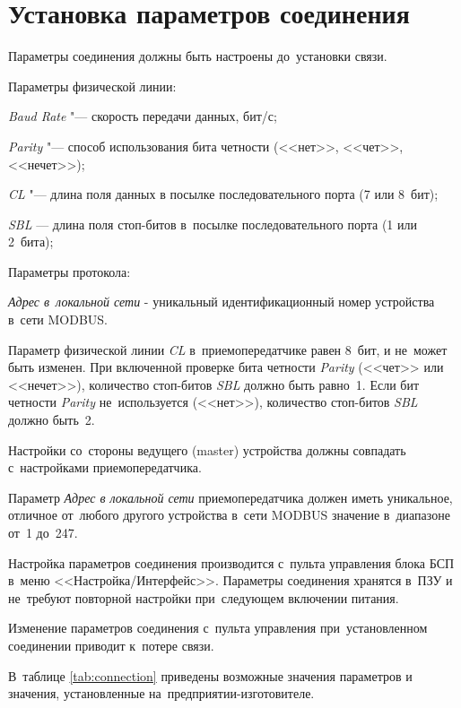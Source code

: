 \section{Установка параметров соединения} \label{sec:setup}

Параметры соединения должны быть настроены до~установки связи. 

Параметры физической линии:
\begin{list}{--}{}
	\item \textit{Baud Rate} "--- скорость передачи данных, бит/с; 
	\item \textit{Parity} "--- способ использования бита четности (<<нет>>, <<чет>>, <<нечет>>); 
	\item \textit{CL} "--- длина поля данных в посылке последовательного порта (7 или 8~бит); 
	\item \textit{SBL} --- длина поля стоп-битов в~посылке последовательного порта (1 или 2~бита);
\end{list}

Параметры протокола:
\begin{list}{--}{}
	\item \textit{Адрес в~локальной сети} - уникальный идентификационный номер устройства в~сети MODBUS.
\end{list}

Параметр физической линии \textit{CL} в~приемопередатчике равен 8~бит, и не~может быть изменен. При включенной проверке бита четности \textit{Parity} (<<чет>> или <<нечет>>), количество стоп-битов \textit{SBL} должно  быть равно~1. Если бит четности \textit{Parity} не~используется (<<нет>>), количество стоп-битов \textit{SBL} должно быть~2.  

Настройки со~стороны ведущего (master) устройства должны совпадать с~настройками приемопередатчика.

Параметр \textit{Адрес в локальной сети} приемопередатчика должен иметь уникальное, отличное от~любого другого устройства в~сети MODBUS значение в~диапазоне от~1 до~247.

Настройка параметров соединения производится с~пульта управления блока БСП в~меню <<Настройка/Интерфейс>>. Параметры соединения хранятся в~ПЗУ и не~требуют повторной настройки при~следующем включении питания.

Изменение параметров соединения с~пульта управления при~установленном соединении приводит к~потере связи.

В~таблице \ref{tab:connection} приведены возможные значения параметров и значения, установленные на~предприятии-изготовителе.

